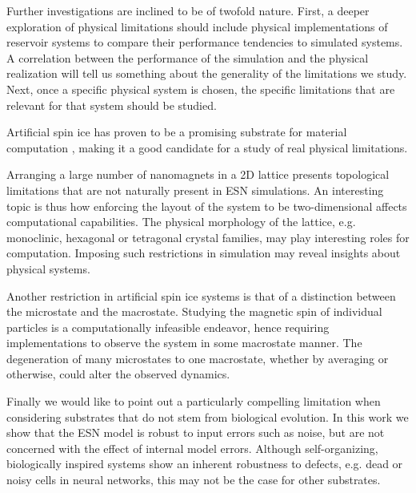 Further investigations are inclined to be of twofold nature. First, a deeper
exploration of physical limitations should include physical implementations of
reservoir systems to compare their performance tendencies to simulated
systems. A correlation between the performance of the simulation and the
physical realization will tell us something about the generality of the
limitations we study. Next, once a specific physical system is chosen, the
specific limitations that are relevant for that system should be studied.

Artificial spin ice has proven to be a promising substrate for material
computation \cite{jensen_computation_2018}, making it a good candidate for a
study of real physical limitations.

Arranging a large number of nanomagnets in a 2D lattice presents topological
limitations that are not naturally present in ESN simulations. An interesting
topic is thus how enforcing the layout of the system to be two-dimensional
affects computational capabilities. The physical morphology of the lattice,
e.g. monoclinic, hexagonal or tetragonal crystal families, may play interesting
roles for computation. Imposing such restrictions in simulation may reveal
insights about physical systems.

Another restriction in artificial spin ice systems is that of a distinction
between the microstate and the macrostate. Studying the magnetic spin of
individual particles is a computationally infeasible endeavor, hence requiring
implementations to observe the system in some macrostate manner. The
degeneration of many microstates to one macrostate, whether by averaging or
otherwise, could alter the observed dynamics.

Finally we would like to point out a particularly compelling limitation when
considering substrates that do not stem from biological evolution. In this work
we show that the ESN model is robust to input errors such as noise, but are not
concerned with the effect of internal model errors. Although self-organizing,
biologically inspired systems show an inherent robustness to defects, e.g. dead
or noisy cells in neural networks, this may not be the case for other
substrates.

